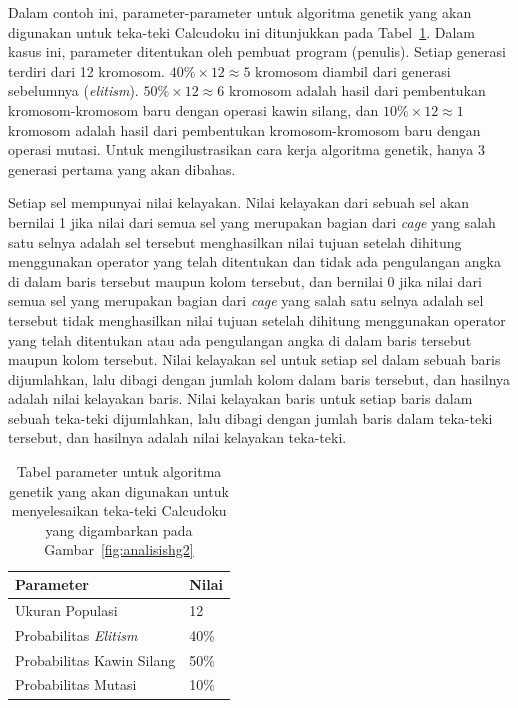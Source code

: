 Dalam contoh ini, parameter-parameter untuk algoritma genetik yang akan digunakan untuk teka-teki Calcudoku ini ditunjukkan pada Tabel~\ref{tab:analisishg1}. Dalam kasus ini, parameter ditentukan oleh pembuat program (penulis). Setiap generasi terdiri dari 12 kromosom. \begin{math}40\% \times 12 \approx 5\end{math} kromosom diambil dari generasi sebelumnya (\textit{elitism}). \begin{math}50\% \times 12 \approx 6\end{math} kromosom adalah hasil dari pembentukan kromosom-kromosom baru dengan operasi kawin silang, dan \begin{math}10\% \times 12 \approx 1\end{math} kromosom adalah hasil dari pembentukan kromosom-kromosom baru dengan operasi mutasi. Untuk mengilustrasikan cara kerja algoritma genetik, hanya 3 generasi pertama yang akan dibahas.

Setiap sel mempunyai nilai kelayakan. Nilai kelayakan dari sebuah sel akan bernilai 1 jika nilai dari semua sel yang merupakan bagian dari \textit{cage} yang salah satu selnya adalah sel tersebut menghasilkan nilai tujuan setelah dihitung menggunakan operator yang telah ditentukan dan tidak ada pengulangan angka di dalam baris tersebut maupun kolom tersebut, dan bernilai 0 jika nilai dari semua sel yang merupakan bagian dari \textit{cage} yang salah satu selnya adalah sel tersebut tidak menghasilkan nilai tujuan setelah dihitung menggunakan operator yang telah ditentukan atau ada pengulangan angka di dalam baris tersebut maupun kolom tersebut. Nilai kelayakan sel untuk setiap sel dalam sebuah baris dijumlahkan, lalu dibagi dengan jumlah kolom dalam baris tersebut, dan hasilnya adalah nilai kelayakan baris. Nilai kelayakan baris untuk setiap baris dalam sebuah teka-teki dijumlahkan, lalu dibagi dengan jumlah baris dalam teka-teki tersebut, dan hasilnya adalah nilai kelayakan teka-teki.

\begin{table}
\centering
\captionsetup{justification=centering}
\caption[Tabel parameter untuk algoritma genetik yang akan digunakan untuk menyelesaikan teka-teki Calcudoku yang digambarkan pada Gambar~\ref{fig:analisishg2}]{Tabel parameter untuk algoritma genetik yang akan digunakan untuk menyelesaikan teka-teki Calcudoku yang digambarkan pada Gambar~\ref{fig:analisishg2}}
\begin{tabular}{| l | l |}
\hline
Parameter & Nilai \\
\hline \hline
Ukuran Populasi & 12 \\
\hline
Probabilitas \textit{Elitism} & 40\% \\
\hline
Probabilitas Kawin Silang & 50\% \\
\hline
Probabilitas Mutasi & 10\% \\
\hline
\end{tabular}
\label{tab:analisishg1}
\end{table}

